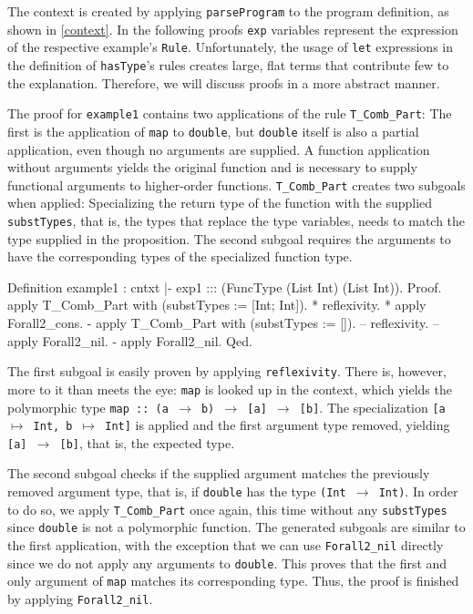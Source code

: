 \documentclass[paper = a4, fleqn, abstract=on, twoside]{scrreprt}
\begin{document}
The context is created by applying \texttt{parseProgram} to the program definition, as shown in \autoref{context}. In the following proofs \texttt{exp} variables represent the expression of the respective example's \texttt{Rule}. Unfortunately, the usage of \texttt{let} expressions in the definition of \texttt{hasType}'s rules creates large, flat terms that contribute few to the explanation. Therefore, we will discuss proofs in a more abstract manner.\\ 
\par
The proof for \texttt{example1} contains two applications of the rule \texttt{T\_Comb\_Part}: The first is the application of \texttt{map} to \texttt{double}, but \texttt{double} itself is also a partial application, even though no arguments are supplied. A function application without arguments yields the original function and is necessary to supply functional arguments to higher-order functions. \texttt{T\_Comb\_Part} creates two subgoals when applied: Specializing the return type of the function with the supplied \texttt{substTypes}, that is, the types that replace the type variables, needs to match the type supplied in the proposition. The second subgoal requires the arguments to have the corresponding types of the specialized function type.
\begin{coqcode}
Definition example1 : cntxt |- exp1 ::: (FuncType (List Int) (List Int)).
Proof.
  apply T_Comb_Part with (substTypes := [Int; Int]).
  * reflexivity.
  * apply Forall2_cons.
    - apply T_Comb_Part with (substTypes := []).
      -- reflexivity.
      -- apply Forall2_nil.
    - apply Forall2_nil.
Qed.
\end{coqcode}
The first subgoal is easily proven by applying \texttt{reflexivity}. There is, however, more to it than meets the eye: \texttt{map} is looked up in the context, which yields the polymorphic type \texttt{map :: (a $\rightarrow$ b) $\rightarrow$ [a] $\rightarrow$ [b]}. The specialization \texttt{[a $\mapsto$ Int, b $\mapsto$ Int]} is applied and the first argument type removed, yielding \texttt{[a] $\rightarrow$ [b]}, that is, the expected type.
\par
The second subgoal checks if the supplied argument matches the previously removed argument type, that is, if \texttt{double} has the type \texttt{(Int $\rightarrow$ Int)}. In order to do so, we apply \texttt{T\_Comb\_Part} once again, this time without any \texttt{substTypes} since \texttt{double} is not a polymorphic function. The generated subgoals are similar to the first application, with the exception that we can use \texttt{Forall2\_nil} directly since we do not apply any arguments to \texttt{double}. This proves that the first and only argument of \texttt{map} matches its corresponding type. Thus, the proof is finished by applying \texttt{Forall2\_nil}.
\end{document}
